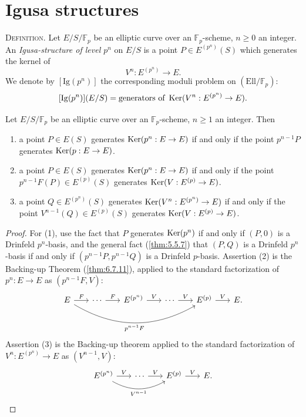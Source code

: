\section{Igusa structures}
\label{sec:12.3}

\kmitem\label{item:12.3.1}
\textsc{Definition.} Let $E/S/\mathbb{F}_p$ be an elliptic curve over an $\mathbb{F}_p$-scheme, $n \ge 0$ an integer. An \emph{Igusa-structure of level $p^n$} on $E/S$ is a point $P \in E^{(p^n)}(S)$ which generates the kernel of
\[
V^n : E^{(p^n)} \to E .
\]
We denote by $[\mathrm{Ig}(p^n)]$ the corresponding moduli problem on $(\mathrm{Ell}/\mathbb{F}_p)$:
\begin{equation}\label{eq:12.3.1.1}
[\mathrm{Ig}(p^n)](E/S) = \text{generators of } \operatorname{Ker}(V^n : E^{(p^n)} \to E) .
\end{equation}

\begin{kprop}\label{prop:12.3.2}
Let $E/S/\mathbb{F}_p$ be an elliptic curve over an $\mathbb{F}_p$-scheme, $n \ge 1$ an integer. Then
\begin{enumerate}[label=(\arabic*)]
\item a point $P \in E(S)$ generates $\operatorname{Ker}(p^n : E \to E)$ if and only if the point $p^{n-1}P$ generates $\operatorname{Ker}(p : E \to E)$.
\item a point $P \in E(S)$ generates $\operatorname{Ker}(p^n : E \to E)$ if and only if the point $p^{n-1}F(P) \in E^{(p)}(S)$ generates $\operatorname{Ker}(V : E^{(p)} \to E)$.
\item a point $Q \in E^{(p^n)}(S)$ generates $\operatorname{Ker}(V^n : E^{(p^n)} \to E)$ if and only if the point $V^{n-1}(Q) \in E^{(p)}(S)$ generates $\operatorname{Ker}(V : E^{(p)} \to E)$.
\end{enumerate}
\end{kprop}

\begin{proof}
For (1), use the fact that $P$ generates $\operatorname{Ker}(p^n)$ if and only if $(P, 0)$ is a Drinfeld $p^n$-basis, and the general fact (\ref{thm:5.5.7}) that $(P, Q)$ is a Drinfeld $p^n$-basis if and only if $(p^{n-1}P, p^{n-1}Q)$ is a Drinfeld $p$-basis.
Assertion (2) is the Backing-up Theorem (\ref{thm:6.7.11}), applied to the standard factorization of $p^n : E \to E$ as $(p^{n-1}F, V)$:
\[
\begin{tikzcd}[column sep=1.8em]
E \arrow[r, "F"] \arrow[rrrr, "p^{n-1}F"', bend right=30] & \cdots \arrow[r, "F"] & E^{(p^n)} \arrow[r, "V"] & \cdots \arrow[r, "V"] & E^{(p)} \arrow[r, "V"] & E .
\end{tikzcd}
\]
Assertion (3) is the Backing-up theorem applied to the standard factorization of $V^n : E^{(p^n)} \to E$ as $(V^{n-1}, V)$:
\[
\begin{tikzcd}[column sep=1.8em]
E^{(p^n)} \arrow[r, "V"] \arrow[rr, "V^{n-1}"', bend right=30] & \cdots \arrow[r, "V"] & E^{(p)} \arrow[r, "V"] & E .
\end{tikzcd} \qedhere
\]
\end{proof}


